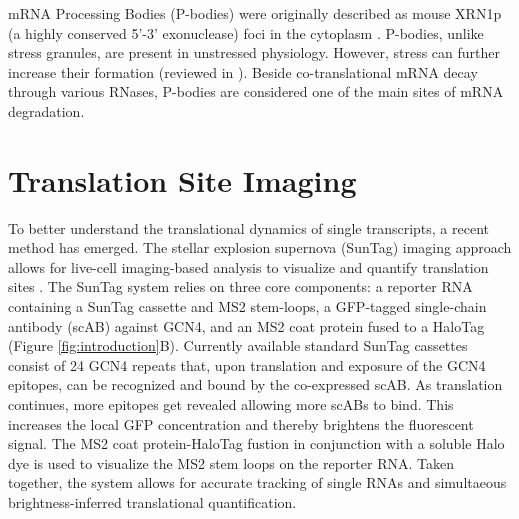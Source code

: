 mRNA Processing Bodies (P-bodies) were originally described as mouse XRN1p
    (a highly conserved 5'-3' exonuclease) foci in the cytoplasm \cite{bashkirov_mouse_1997}.
P-bodies, unlike stress granules, are present in unstressed physiology.
However, stress can further increase their formation (reviewed in \cite{parker_p_2007}).
Beside co-translational mRNA decay through various RNases, P-bodies are considered one
    of the main sites of mRNA degradation.

\section{Translation Site Imaging} \label{translation_site_imaging}

To better understand the translational dynamics of single transcripts, a recent
    method has emerged.
The stellar explosion supernova (SunTag) imaging approach allows for live-cell imaging-based analysis to visualize and
    quantify translation sites \cite{tanenbaum_protein-tagging_2014}.
The SunTag system relies on three core components: a reporter RNA containing a SunTag 
    cassette and MS2 stem-loops, a GFP-tagged single-chain antibody (scAB) against GCN4,
    and an MS2 coat protein fused to a HaloTag (Figure \ref{fig:introduction}B).
Currently available standard SunTag cassettes consist of 24 GCN4 repeats that, upon translation
    and exposure of the GCN4 epitopes, can be recognized and bound by the co-expressed scAB.
As translation continues, more epitopes get revealed allowing more scABs to bind.
This increases the local GFP concentration and thereby brightens the fluorescent signal.
The MS2 coat protein-HaloTag fustion in conjunction with a soluble Halo dye is used
    to visualize the MS2 stem loops on the reporter RNA.
Taken together, the system allows for accurate tracking of single RNAs and simultaeous
    brightness-inferred translational quantification.
